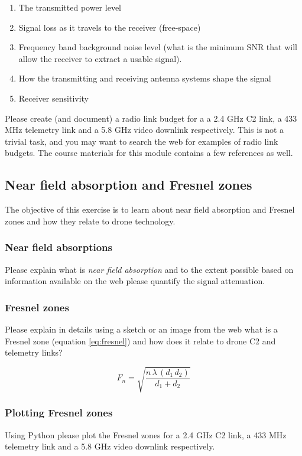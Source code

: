 \documentclass[a4paper,10pt,fleqn]{article}
\begin{document}
\begin{enumerate}
	\item The transmitted power level
	\item Signal loss as it travels to the receiver (free-space)
	\item Frequency band background noise level (what is the minimum SNR that will allow the receiver to extract a usable signal).
	\item How the transmitting and receiving antenna systems shape the signal
	\item Receiver sensitivity
\end{enumerate}


Please create (and document) a radio link budget for a a 2.4 GHz C2 link, a 433 MHz telemetry link and a 5.8 GHz video downlink respectively. This is not a trivial task, and you may want to search the web for examples of radio link budgets. The course materials for this module contains a few references as well.

\subsection{Near field absorption and Fresnel zones}
The objective of this exercise is to learn about near field absorption and Fresnel zones and how they relate to drone technology.


\subsubsection{Near field absorptions}
Please explain what is \textit{near field absorption} and to the extent possible based on information available on the web please quantify the signal attenuation.

\subsubsection{Fresnel zones}
Please explain in details using a sketch or an image from the web what is a Fresnel zone (equation \ref{eq:fresnel}) and how does it relate to drone C2 and telemetry links?


\begin{equation}
F_n = \sqrt{\frac{n\, \lambda \, (d_1\, d_2)}{d_1 + d_2}}
\label{eq:fresnel}
\end{equation}


\subsubsection{Plotting Fresnel zones}
Using Python please plot the Fresnel zones for a 2.4 GHz C2 link, a 433 MHz telemetry link and a 5.8 GHz video downlink respectively. 
\end{document}
